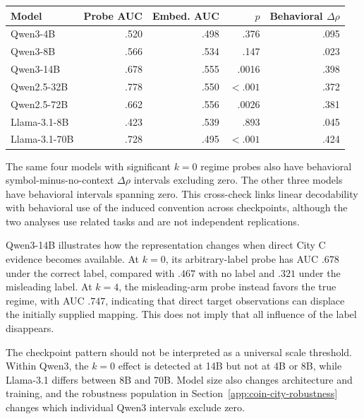 \begin{center}
\begin{minipage}{0.90\linewidth}
\centering
{}
\label{tab:coin-city-probe-power}
\small
\begin{tabular}{lrrrr}
\toprule
Model & Probe AUC & Embed. AUC & \(p\) & Behavioral \(\Delta\rho\) \\
\midrule
Qwen3-4B & .520 & .498 & .376 & .095 \\
Qwen3-8B & .566 & .534 & .147 & .023 \\
Qwen3-14B & .678 & .555 & .0016 & .398 \\
Qwen2.5-32B & .778 & .550 & \(<.001\) & .372 \\
Qwen2.5-72B & .662 & .556 & .0026 & .381 \\
Llama-3.1-8B & .423 & .539 & .893 & .045 \\
Llama-3.1-70B & .728 & .495 & \(<.001\) & .424 \\
\bottomrule
\end{tabular}
\end{minipage}
\end{center}

The same four models with significant \(k=0\) regime probes also have behavioral symbol-minus-no-context \(\Delta\rho\) intervals excluding zero.
The other three models have behavioral intervals spanning zero.
This cross-check links linear decodability with behavioral use of the induced convention across checkpoints, although the two analyses use related tasks and are not independent replications.

Qwen3-14B illustrates how the representation changes when direct City C evidence becomes available.
At \(k=0\), its arbitrary-label probe has AUC $.678$ under the correct label, compared with $.467$ with no label and $.321$ under the misleading label.
At \(k=4\), the misleading-arm probe instead favors the true regime, with AUC $.747$, indicating that direct target observations can displace the initially supplied mapping.
This does not imply that all influence of the label disappears.

The checkpoint pattern should not be interpreted as a universal scale threshold.
Within Qwen3, the \(k=0\) effect is detected at 14B but not at 4B or 8B, while Llama-3.1 differs between 8B and 70B.
Model size also changes architecture and training, and the robustness population in Section~\ref{app:coin-city-robustness} changes which individual Qwen3 intervals exclude zero.

